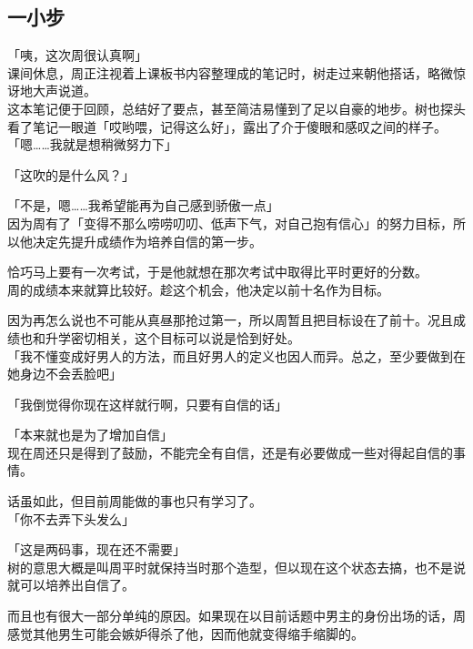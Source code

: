 \subsection{一小步}

「咦，这次周很认真啊」\\

课间休息，周正注视着上课板书内容整理成的笔记时，树走过来朝他搭话，略微惊讶地大声说道。\\

这本笔记便于回顾，总结好了要点，甚至简洁易懂到了足以自豪的地步。树也探头看了笔记一眼道「哎哟喂，记得这么好」，露出了介于傻眼和感叹之间的样子。\\

「嗯……我就是想稍微努力下」

「这吹的是什么风？」

「不是，嗯……我希望能再为自己感到骄傲一点」\\

因为周有了「变得不那么唠唠叨叨、低声下气，对自己抱有信心」的努力目标，所以他决定先提升成绩作为培养自信的第一步。

恰巧马上要有一次考试，于是他就想在那次考试中取得比平时更好的分数。\\

周的成绩本来就算比较好。趁这个机会，他决定以前十名作为目标。

因为再怎么说也不可能从真昼那抢过第一，所以周暂且把目标设在了前十。况且成绩也和升学密切相关，这个目标可以说是恰到好处。\\

「我不懂变成好男人的方法，而且好男人的定义也因人而异。总之，至少要做到在她身边不会丢脸吧」

「我倒觉得你现在这样就行啊，只要有自信的话」

「本来就也是为了增加自信」\\

现在周还只是得到了鼓励，不能完全有自信，还是有必要做成一些对得起自信的事情。

话虽如此，但目前周能做的事也只有学习了。\\

「你不去弄下头发么」

「这是两码事，现在还不需要」\\

树的意思大概是叫周平时就保持当时那个造型，但以现在这个状态去搞，也不是说就可以培养出自信了。

而且也有很大一部分单纯的原因。如果现在以目前话题中男主的身份出场的话，周感觉其他男生可能会嫉妒得杀了他，因而他就变得缩手缩脚的。\\

